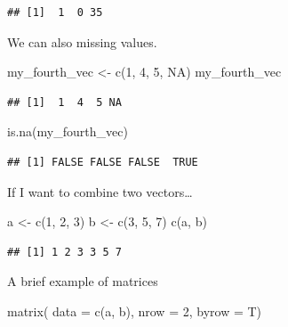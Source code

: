 \documentclass[
]{book}
\newenvironment{Shaded}{\begin{snugshade}}{\end{snugshade}}
\newcommand{\AttributeTok}[1]{\textcolor[rgb]{0.77,0.63,0.00}{#1}}
\newcommand{\ConstantTok}[1]{\textcolor[rgb]{0.00,0.00,0.00}{#1}}
\newcommand{\DecValTok}[1]{\textcolor[rgb]{0.00,0.00,0.81}{#1}}
\newcommand{\FunctionTok}[1]{\textcolor[rgb]{0.00,0.00,0.00}{#1}}
\newcommand{\NormalTok}[1]{#1}
\newcommand{\OtherTok}[1]{\textcolor[rgb]{0.56,0.35,0.01}{#1}}
\begin{document}
\begin{verbatim}
## [1]  1  0 35
\end{verbatim}

We can also missing values.

\begin{Shaded}
\begin{Highlighting}[]
\NormalTok{my\_fourth\_vec }\OtherTok{\textless{}{-}} \FunctionTok{c}\NormalTok{(}\DecValTok{1}\NormalTok{, }\DecValTok{4}\NormalTok{, }\DecValTok{5}\NormalTok{, }\ConstantTok{NA}\NormalTok{)}
\NormalTok{my\_fourth\_vec}
\end{Highlighting}
\end{Shaded}

\begin{verbatim}
## [1]  1  4  5 NA
\end{verbatim}

\begin{Shaded}
\begin{Highlighting}[]
\FunctionTok{is.na}\NormalTok{(my\_fourth\_vec)}
\end{Highlighting}
\end{Shaded}

\begin{verbatim}
## [1] FALSE FALSE FALSE  TRUE
\end{verbatim}

If I want to combine two vectors\ldots{}

\begin{Shaded}
\begin{Highlighting}[]
\NormalTok{a }\OtherTok{\textless{}{-}} \FunctionTok{c}\NormalTok{(}\DecValTok{1}\NormalTok{, }\DecValTok{2}\NormalTok{, }\DecValTok{3}\NormalTok{)}
\NormalTok{b }\OtherTok{\textless{}{-}} \FunctionTok{c}\NormalTok{(}\DecValTok{3}\NormalTok{, }\DecValTok{5}\NormalTok{, }\DecValTok{7}\NormalTok{)}
\FunctionTok{c}\NormalTok{(a, b)}
\end{Highlighting}
\end{Shaded}

\begin{verbatim}
## [1] 1 2 3 3 5 7
\end{verbatim}

A brief example of matrices

\begin{Shaded}
\begin{Highlighting}[]
\FunctionTok{matrix}\NormalTok{(}
  \AttributeTok{data =} \FunctionTok{c}\NormalTok{(a, b),}
  \AttributeTok{nrow =} \DecValTok{2}\NormalTok{,}
  \AttributeTok{byrow =}\NormalTok{ T)}
\end{Highlighting}
\end{Shaded}
\end{document}
